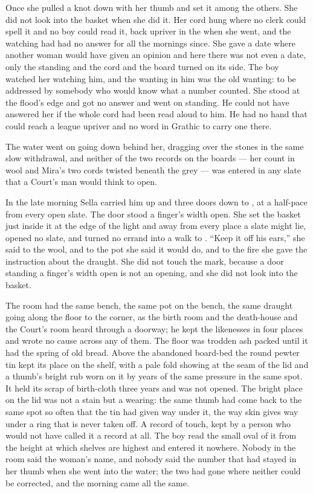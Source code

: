 Once she pulled a knot down with her thumb and set it among the others. She did not look into the basket when she did it. Her cord hung where no clerk could spell it and no boy could read it, back upriver in the  when she went, and the watching had had no answer for all the mornings since. She gave a date where another woman would have given an opinion and here there was not even a date, only the standing and the cord and the board turned on its side. The boy watched her watching him, and the wanting in him was the old wanting: to be addressed by somebody who would know what a number counted. She stood at the flood's edge and got no answer and went on standing. He could not have answered her if the whole cord had been read aloud to him. He had no hand that could reach a league upriver and no word in Grathic to carry one there.

The water went on going down behind her, dragging over the stones in the same slow withdrawal, and neither of the two records on the boards --- her count in wool and Mira's two cords twisted beneath the grey --- was entered in any slate that a Court's man would think to open.

\scenebreak

In the late morning Sella carried him up  and three doors down to , at a half-pace from every open slate. The door stood a finger's width open. She set the basket just inside it at the edge of the light and away from every place a slate might lie, opened no slate, and turned no errand into a walk to . “Keep it off his ears,” she said to the wool, and to the pot she said it would do, and to the fire she gave the instruction about the draught. She did not touch the mark, because a door standing a finger's width open is not an opening, and she did not look into the basket.

The room had the same bench, the same pot on the bench, the same draught going along the floor to the corner, as the birth room and the death-house and the Court's room heard through a doorway; he kept the likenesses in four places and wrote no cause across any of them. The floor was trodden ash packed until it had the spring of old bread. Above the abandoned board-bed the round pewter tin kept its place on the shelf, with a pale fold showing at the seam of the lid and a thumb's bright rub worn on it by years of the same pressure in the same spot. It held its scrap of birth-cloth three years and was not opened. The bright place on the lid was not a stain but a wearing: the same thumb had come back to the same spot so often that the tin had given way under it, the way skin gives way under a ring that is never taken off. A record of touch, kept by a person who would not have called it a record at all. The boy read the small oval of it from the height at which shelves are highest and entered it nowhere. Nobody in the room said the woman's name, and nobody said the number that had stayed in her thumb when she went into the water; the two had gone where neither could be corrected, and the morning came all the same.

